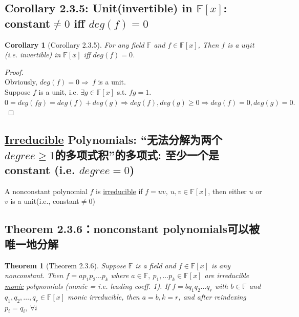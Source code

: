 \documentclass[11pt,a4paper]{article}
\newtheorem{theorem}{Theorem}
\newtheorem{corollary}{Corollary}
\begin{document}
\subsection{Corollary 2.3.5: Unit(invertible) in $\mathbb{F}[x]$: constant$\neq 0$ iff $deg(f)=0$}
\begin{corollary}[Corollary 2.3.5]
    For any field $\mathbb{F}$ and $f \in \mathbb{F}[x]$, Then $f$ is a $\underline{unit}$(i.e. invertible) in $\mathbb{F}[x]$ iff $deg(f)=0$.
\end{corollary}
\begin{proof}
\quad\\
Obviously, $deg(f)=0\Rightarrow\ f$ is a unit.\\
Suppose $f$ is a unit, i.e. $\exists g\in\mathbb{F}[x]$ s.t. $fg=1$.\\
$0=deg(fg)=deg(f)+deg(g)\Rightarrow deg(f),deg(g)\geq0\Rightarrow deg(f)=0,deg(g)=0.$
\end{proof}
\subsection{\underline{Irreducible} Polynomials: “无法分解为两个$degree\geq1$的多项式积”的多项式: 至少一个是constant (i.e. $degree=0$)}
A nonconstant polynomial $f$ is \underline{irreducible} if $f=uv,\ u,v\in\mathbb{F}[x]$, then either $u$ or $v$ is a unit(i.e., constant$\neq0$)


\subsection{Theorem 2.3.6：nonconstant polynomials可以被唯一地分解}
\begin{theorem}[Theorem 2.3.6]
Suppose $\mathbb{F}$ is a field and $f\in\mathbb{F}[x]$ is any nonconstant. Then $f = ap_1p_2\dots p_k$ where $a \in \mathbb{F},\ p_1,\dots p_k \in \mathbb{F}[x]$ are irreducible \underline{monic} polynomials (monic = i.e. leading coeff. 1). If $f = bq_1q_2\dots q_r$ with $b \in \mathbb{F}$ and
$q_1,q_2,\dots ,q_r \in \mathbb{F}[x]$ monic irreducible, then $a = b, k = r$, and after reindexing $p_i = q_i,\ \forall i$
\end{theorem}
\end{document}
